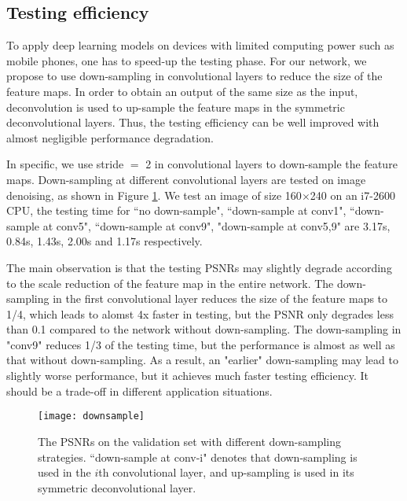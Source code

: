 \subsection{Testing efficiency}

To apply deep learning models on devices with limited computing power such as mobile
phones, one has to speed-up the testing phase. For our network, we propose to use
down-sampling in convolutional layers to reduce the size of the feature maps. In order
to obtain an output of the same size as the input, deconvolution is used to up-sample
the feature maps in the symmetric deconvolutional layers.  Thus, the testing
efficiency can be well improved with almost negligible  performance degradation.


In specific, we use stride $=$ 2 in convolutional layers to down-sample the feature maps.
Down-sampling at different convolutional layers are tested on image denoising, as shown
in Figure \ref{fig16}. We test an image of size 160$\times$240 on an i7-2600 CPU, the testing
time for ``no down-sample", ``down-sample at conv1", ``down-sample at conv5",
``down-sample at conv9", "down-sample at conv5,9" are 3.17s, 0.84s, 1.43s, 2.00s and
1.17s respectively.

The main observation is that the testing PSNRs may slightly degrade according to the scale
reduction of the feature map in the entire network. The down-sampling in the first
convolutional layer reduces the size of the feature maps to 1/4, which leads to alomst 4x
faster in testing, but the PSNR only degrades less than 0.1 compared to the network without
down-sampling. The down-sampling in "conv9" reduces 1/3 of the testing time, but the
performance is almost as well as that without down-sampling. As a result, an "earlier"
down-sampling may lead to slightly worse performance, but it achieves much faster testing
efficiency. It should be a trade-off in different application situations.


\begin{figure}[t!]
\centering
\texttt{[image: downsample]}
\caption{The PSNRs on the validation set with different down-sampling strategies.
``down-sample at conv-i" denotes that down-sampling is used in the $i$th convolutional
layer, and up-sampling is used in its symmetric deconvolutional layer.}
\label{fig16}
\end{figure}

